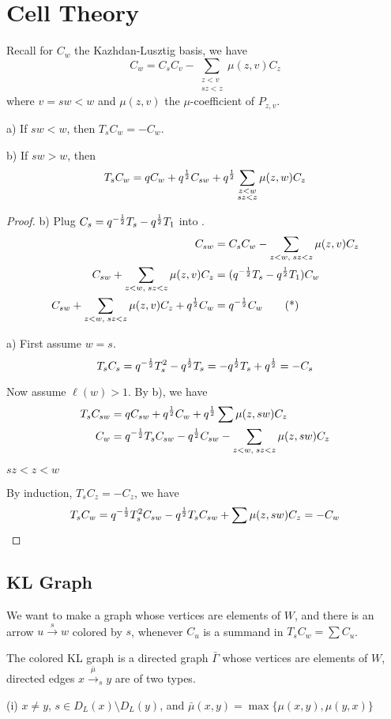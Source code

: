 \section{Cell Theory}

Recall for $C_w$ the Kazhdan-Lusztig basis, we have
\begin{equation}\label{eq:Cw_factor}
C_w=C_sC_v-\sum_{\substack{z<v\\ sz<z}}\mu(z,v) C_z\end{equation}
where $v=sw<w$ and $\mu(z,v)$ the $\mu$-coefficient of $P_{z,v}$.

\begin{theorem}
	a) If $sw<w$, then $T_s C_w=-C_w$.
	
	b) If $sw>w$, then 
	\[T_sC_w = q C_w + q^{1\over 2}C_{sw} + q^{1\over 2}\sum_{ \substack{z<w\\ sz<z}}\mu(z,w) C_z  \]
\end{theorem}
\begin{proof}
 b) Plug
	$C_s=q^{-{1\over 2}}T_s -q^{1\over 2} T_1$ into .
	\begin{align*}
		C_{sw}&=C_s C_w - \sum_{\substack{z<w,\; sz<z}}\mu(z,v) C_z\\
		C_{sw}+\sum_{\substack{z<w,\; sz<z}}\mu(z,v) C_z&=(q^{-{1\over 2}}T_s -q^{1\over 2} T_1)C_w\\
		C_{sw}+\sum_{\substack{z<w,\; sz<z}}\mu(z,v) C_z+q^{1\over 2}C_w&=q^{-{1\over 2}}C_w\tag{*}
	\end{align*}
	
	a) First assume $w=s$.
	\[T_sC_s=q^{-{1\over 2}}T_s^2 - q^{1\over 2}T_s = -q^{1\over 2}T_s + q^{1\over 2}=-C_s\]
	
	Now assume $\ell(w)>1$. By b), we have
	\begin{align*}
	T_s C_{sw}&=qC_{sw}+q^{1\over 2} C_w + q^{1\over 2}\sum \mu(z,sw)C_z\\
	C_w	&= q^{-{1\over 2}} T_s C_{sw} - q^{1\over 2} C_{sw} - \sum_{z<w,\; sz<z}\mu(z,sw) C_z
	\end{align*}
	
	$sz<z<w$
	
	By induction, $T_sC_z=-C_z$, we have
	\[T_s C_w = q^{-{1\over 2}}T_s^2 C_{sw}-q^{1\over 2}T_s C_{sw}+\sum\mu(z,sw)C_z=-C_w\]

	
	
	
\end{proof}
\subsection{KL Graph}
We want to make a graph whose vertices are elements of $W$, and there is an arrow $u \xrightarrow{s} w$ colored by $s$, whenever $C_u$ is a summand in $T_s C_w = \sum C_u$.

\begin{definition}
	The colored KL graph is a directed graph $\bar \Gamma$ whose vertices are elements of $W$, directed edges $x \xrightarrow{\bar \mu}_{s} y$ are of two types.
	
	(i) $x\neq y$, $s\in D_L(x)\setminus D_L(y)$, and $\bar \mu(x,y)=\max\{\mu(x,y),\mu(y,x)\}$
\end{definition}